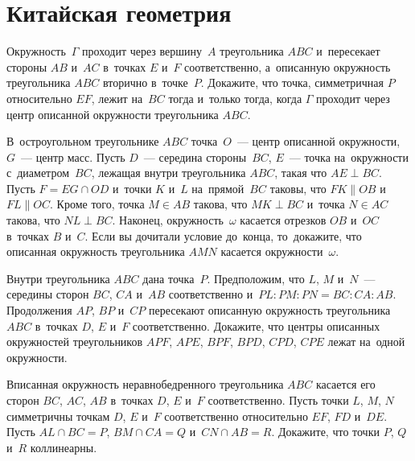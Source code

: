 
\section*{Китайская геометрия}


\begin{problems}

\item
Окружность~$\Gamma$ проходит через вершину~$A$ треугольника $ABC$ и~пересекает
стороны $AB$ и~$AC$ в~точках $E$ и~$F$ соответственно, а~описанную окружность
треугольника $ABC$ вторично в~точке~$P$.
Докажите, что точка, симметричная $P$ относительно $EF$, лежит на~$BC$ тогда
и~только тогда, когда $\Gamma$ проходит через центр описанной окружности
треугольника $ABC$.

\item
В~остроугольном треугольнике $ABC$ точка~$O$~--- центр описанной окружности,
$G$~--- центр масс.
Пусть $D$~--- середина стороны~$BC$, $E$~--- точка на~окружности
с~диаметром~$BC$, лежащая внутри треугольника $ABC$, такая что $AE \perp BC$.
Пусть $F = EG \cap OD$ и~точки $K$ и~$L$ на~прямой~$BC$ таковы, что
$FK \parallel OB$ и~$FL \parallel OC$.
Кроме того, точка $M \in AB$ такова, что $MK \perp BC$ и~точка $N \in AC$
такова, что $NL \perp BC$.
Наконец, окружность~$\omega$ касается отрезков $OB$ и~$OC$ в~точках $B$ и~$C$.
Если вы дочитали условие до~конца, то~докажите, что описанная окружность
треугольника $AMN$ касается окружности~$\omega$.

\item
Внутри треугольника $ABC$ дана точка~$P$.
Предположим, что $L$, $M$ и~$N$~--- середины сторон $BC$, $CA$ и~$AB$
соответственно и~$PL : PM : PN = BC : CA : AB$.
Продолжения $AP$, $BP$ и~$CP$ пересекают описанную окружность треугольника
$ABC$ в~точках $D$, $E$ и~$F$ соответственно.
Докажите, что центры описанных окружностей треугольников
$APF$, $APE$, $BPF$, $BPD$, $CPD$, $CPE$
лежат на~одной окружности.

\item
Вписанная окружность неравнобедренного треугольника $ABC$ касается его
сторон $BC$, $AC$, $AB$ в~точках $D$, $E$ и~$F$ соответственно.
Пусть точки $L$, $M$, $N$ симметричны точкам $D$, $E$ и~$F$ соответственно
относительно $EF$, $FD$ и~$DE$.
Пусть $AL \cap BC = P$, $BM \cap CA = Q$ и~$CN \cap AB = R$.
Докажите, что точки $P$, $Q$ и~$R$ коллинеарны.


\end{problems}
